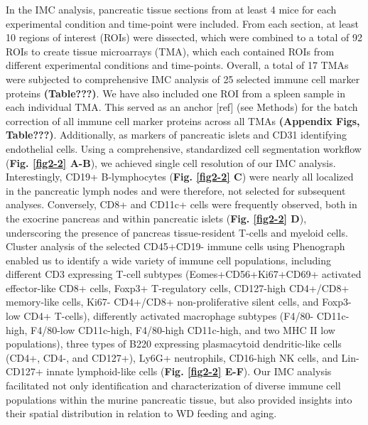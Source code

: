 In the IMC analysis, pancreatic tissue sections from at least 4 mice for each experimental condition and time-point were included. From each section, at least 10 regions of interest (ROIs) were dissected, which were combined to a total of 92 ROIs to create tissue microarrays (TMA), which each contained ROIs from different experimental conditions and time-points. Overall, a total of 17 TMAs were subjected to comprehensive IMC analysis of 25 selected immune cell marker proteins \textbf{(Table???)}. We have also included one ROI from a spleen sample in each individual TMA. This served as an anchor [ref] (see Methods) for the batch correction of all immune cell marker proteins across all TMAs \textbf{(Appendix Figs, Table???)}. Additionally, as markers of pancreatic islets and CD31 identifying endothelial cells. Using a comprehensive, standardized cell segmentation workflow (\textbf{Fig. \ref{fig2-2} A-B}), we achieved single cell resolution of our IMC analysis. Interestingly, CD19+ B-lymphocytes (\textbf{Fig. \ref{fig2-2} C}) were nearly all localized in the pancreatic lymph nodes and were therefore, not selected for subsequent analyses. Conversely, CD8+ and CD11c+ cells were frequently observed, both in the exocrine pancreas and within pancreatic islets (\textbf{Fig. \ref{fig2-2} D}), underscoring the presence of pancreas tissue-resident T-cells and myeloid cells. Cluster analysis of the selected CD45+CD19- immune cells using Phenograph enabled us to identify a wide variety of immune cell populations, including different CD3 expressing T-cell subtypes (Eomes+CD56+Ki67+CD69+ activated effector-like CD8+ cells, Foxp3+ T-regulatory cells, CD127-high CD4+/CD8+ memory-like cells, Ki67- CD4+/CD8+ non-proliferative silent cells, and Foxp3-low CD4+ T-cells), differently activated macrophage subtypes (F4/80- CD11c-high, F4/80-low CD11c-high, F4/80-high CD11c-high, and two MHC II low populations), three types of B220 expressing plasmacytoid dendritic-like cells (CD4+, CD4-, and CD127+), Ly6G+ neutrophils, CD16-high NK cells, and Lin-CD127+ innate lymphoid-like cells (\textbf{Fig. \ref{fig2-2} E-F}). Our IMC analysis facilitated not only identification and characterization of diverse immune cell populations within the murine pancreatic tissue, but also provided insights into their spatial distribution in relation to WD feeding and aging. 

